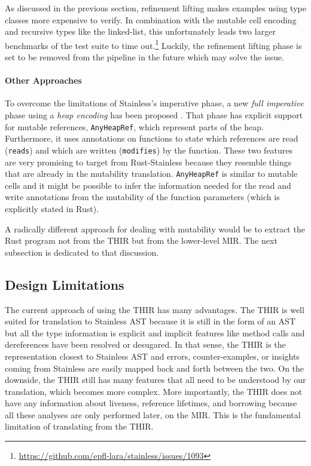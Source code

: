 As discussed in the previous section, refinement lifting makes examples using
type classes more expensive to verify. In combination with the mutable cell
encoding and recursive types like the linked-list, this unfortunately leads two
larger benchmarks of the test suite to time
out.\footnote{\url{https://github.com/epfl-lara/stainless/issues/1093}} Luckily,
the refinement lifting phase is set to be removed from the pipeline in the
future which may solve the issue.

\paragraph{Other Approaches}

To overcome the limitations of Stainless's imperative phase, a new \emph{full
imperative} phase using a \emph{heap encoding} has been proposed
\cite{new-imperative}. That phase has explicit support for mutable references,
\lstinline!AnyHeapRef!, which represent parts of the heap. Furthermore, it uses
annotations on functions to state which references are read (\lstinline!reads!)
and which are written (\lstinline!modifies!) by the function. These two features
are very promising to target from Rust-Stainless because they resemble things
that are already in the mutability translation. \lstinline!AnyHeapRef! is
similar to mutable cells and it might be possible to infer the information
needed for the read and write annotations from the mutability of the function
parameters (which is explicitly stated in Rust).

A radically different approach for dealing with mutability would be to extract
the Rust program not from the THIR but from the lower-level MIR. The next
subsection is dedicated to that discussion.

\subsection{Design Limitations}
\label{mir-thir}

The current approach of using the THIR has many advantages. The THIR is well
suited for translation to Stainless AST because it is still in the form of an
AST but all the type information is explicit and implicit features like method
calls and dereferences have been resolved or desugared. In that sense, the THIR
is the representation closest to Stainless AST and errors, counter-examples, or
insights coming from Stainless are easily mapped back and forth between the two.
On the downside, the THIR still has many features that all need to be understood
by our translation, which becomes more complex. More importantly, the THIR does
not have any information about liveness, reference lifetimes, and borrowing
because all these analyses are only performed later, on the MIR. This is the
fundamental limitation of translating from the THIR.

